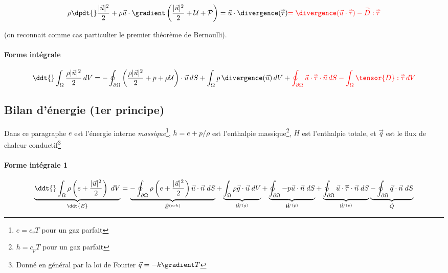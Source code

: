 \begin{equation}
		\rho \dpdt{} \frac{ |\vec{u}|^2}{2} 
		+ \rho \vec{u} \cdot \gradient \left( \frac{ |\vec{u}|^2}{2} + {\cal U} +  {\cal P} \right) 
		= 
		 \vec{u} \cdot \divergence ( \mytensor{\tau} ) \textcolor{red}{= \divergence ( \vec{u} \cdot \mytensor{\tau} ) - \mytensor{D} :\mytensor{\tau}}
\end{equation}

(on reconnait comme cas particulier le premier théorème de Bernoulli).



\paragraph{Forme intégrale}
	\begin{equation}
		\ddt{} \int_{\Omega} \frac{\rho |\vec{u}|^2}{2} \, dV 
		= -  \oint_{\partial \Omega} \left( \frac{\rho |\vec{u}|^2}{2} + p + \rho {\cal U} \right)  \cdot \vec u \, dS
		+ \int_{\Omega} p \, \divergence (\vec{u}) \, dV 
+ \textcolor{red}{ \oint_{\partial \Omega}  \vec{u} \cdot \mytensor{\tau} \cdot \vec{n} \, dS
 -  \int_{\Omega} \tensor{D} : \mytensor{\tau}  \, dV}	
		\label{eq:bilan_global_eulerien_ec}
	\end{equation}


\subsection{Bilan d'énergie (1er principe)}

Dans ce paragraphe $e$ est l'énergie interne {\em massique}\footnote{ $e = c_v T$ pour un gaz parfait}, $h = e+p/\rho$ est l'enthalpie massique\footnote{ $h = c_p T$ pour un gaz parfait}, $H$ est l'enthalpie totale, et $\vec q$ est le flux de chaleur conductif\footnote{ Donné en général par la loi de Fourier $\vec{q}=-k \gradient T$ }  

\paragraph{Forme intégrale 1}
\begin{equation}
		\underbrace{\ddt{} \int_{\Omega} \rho \left( e + \frac{ |\vec{u}|^2}{2} \right) \; dV
		}_{\ddt{E} }		 
		= \underbrace{  - \oint_{\partial \Omega}  \rho \left( e + \frac{ |\vec{u}|^2}{2} \right) \vec{u} \cdot \vec{n} \; dS
		}_{\dot{E}^{(ech)}}
		+ \underbrace{\int_{\Omega} \rho \vec{g} \cdot \vec{u} \; dV
		}_{\dot{W}^{(g)}} 
		+ \underbrace{ \oint_{\partial \Omega} -p \vec{u} \cdot  \vec{n}   \; dS 
		}_{\dot{W}^{(p)}} 
		+ \underbrace{ \oint_{\partial \Omega} \vec{u} \cdot  \mytensor{\tau} \cdot \vec{n}  \; dS 
		}_{\dot{W}^{(v)}} 
		 \underbrace{ - \oint_{\partial \Omega} \vec{q} \cdot \vec{n} \; dS
		}_{\dot{Q}} 
		\label{eq:bilan_global_eulerien_e1}
\end{equation}

